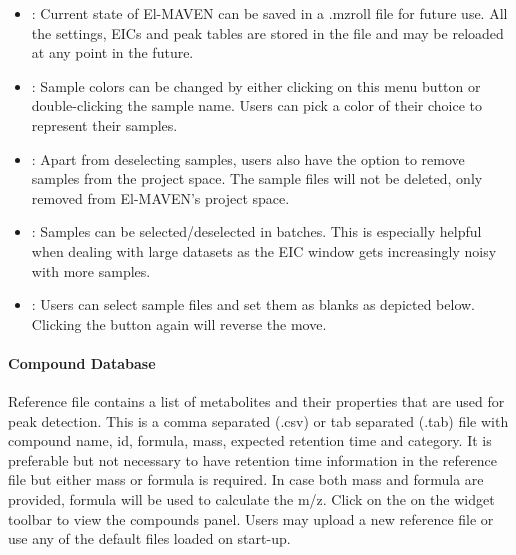 \documentclass[letterpaper,10pt,english,openany,oneside]{sphinxmanual}
\begin{document}
\begin{itemize}
\item {} 
 : Current state of El-MAVEN can be saved in a .mzroll file for future use. All the settings, EICs and peak tables are stored in the file and may be reloaded at any point in the future.

\item {} 
 : Sample colors can be changed by either clicking on this menu button or double-clicking the sample name. Users can pick a color of their choice to represent their samples.

\item {} 
 : Apart from deselecting samples, users also have the option to remove samples from the project space. The sample files will not be deleted, only removed from El-MAVEN’s project space.

\item {} 
 : Samples can be selected/deselected in batches. This is especially helpful when dealing with large datasets as the EIC window gets increasingly noisy with more samples.

\item {} 
 : Users can select sample files and set them as blanks as depicted below. Clicking the button again will reverse the move.

\end{itemize}



\paragraph{Compound Database}
\label{\detokenize{IntroductiontoElMAVENUI:compound-database}}


Reference file contains a list of metabolites and their properties that are used for peak detection. This is a comma separated (.csv) or tab separated (.tab) file with compound name, id, formula, mass, expected retention time and category. It is preferable but not necessary to have retention time information in the reference file but either mass or formula is required. In case both mass and formula are provided, formula will be used to calculate the m/z. Click on the  on the widget toolbar to view the compounds panel. Users may upload a new reference file or use any of the default files loaded on start-up.
\end{document}
